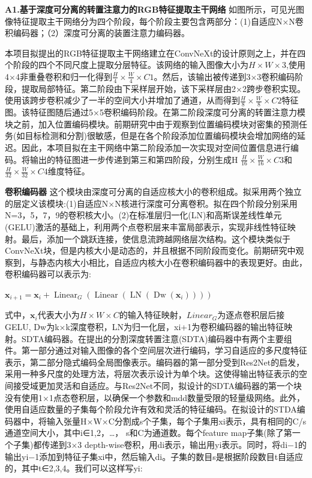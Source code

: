 \documentclass[12pt]{article}
\begin{document}
\textbf{A1.基于深度可分离的转置注意力的RGB特征提取主干网络}
如图所示，可见光图像特征提取主干网络分为四个阶段，每个阶段主要包含两部分：(1)自适应N×N卷积编码器；（2）深度可分离的装置注意力编码器。

本项目拟提出的RGB特征提取主干网络建立在ConvNeXt的设计原则之上，并在四个阶段的四个不同尺度上提取分层特征。该网络的输入图像大小为$H \times W \times 3$,使用4×4非重叠卷积和归一化得到$\frac{H}{4} \times \frac{W}{4} \times C 1$。然后，该输出被传递到3×3卷积编码阶段，提取局部特征。第二阶段由下采样层开始，该下采样层由2×2跨步卷积实现。使用该跨步卷积减少了一半的空间大小并增加了通道，从而得到$\frac{H}{8} \times \frac{W}{8} \times C 2$特征图。该特征图随后通过5×5卷积编码阶段。在第二阶段深度可分离的转置注意力模块之前，加入位置编码模块。前期研究中由于观察到位置编码模块对密集的预测任务(如目标检测和分割)很敏感，但是在各个阶段添加位置编码模块会增加网络的延迟。因此，本项目拟在主干网络中第二阶段添加一次实现对空间位置信息进行编码。将输出的特征图进一步传递到第三和第四阶段，分别生成H $\frac{H}{16} \times \frac{W}{16} \times C 3$和$\frac{H}{32} \times \frac{W}{32} \times C 4$维度特征。

\textbf{卷积编码器} 这个模块由深度可分离的自适应核大小的卷积组成。拟采用两个独立的层定义该模块:(1)自适应N×N核进行深度可分离卷积。拟在四个阶段分别采用N=3，5，7，9的卷积核大小。(2)在标准层归一化(LN)和高斯误差线性单元(GELU)激活的基础上，利用两个点卷积层来丰富局部表示，实现非线性特征映射。最后，添加一个跳跃连接，使信息流跨越网络层次结构。这个模块类似于ConvNeXt块，但是内核大小是动态的，并且根据不同阶段而变化。前期研究中观察到，与静态内核大小相比，自适应内核大小在卷积编码器中的表现更好。由此，卷积编码器可以表示为:

$\boldsymbol{x}_{i+1}=\boldsymbol{x}_{i}+\operatorname{Linear}_{G}\left(\operatorname{Linear}\left(\operatorname{LN}\left(\operatorname{Dw}\left(\boldsymbol{x}_{i}\right)\right)\right)\right)$

式中，$\boldsymbol{x}_{i}$代表大小为$H \times W \times C$的输入特征映射，$Linear_{G}$为逐点卷积层后接GELU, Dw为k×k深度卷积，LN为归一化层，xi+1为卷积编码器的输出特征映射。SDTA编码器。在提出的分割深度转置注意(SDTA)编码器中有两个主要组件。第一部分通过对输入图像的各个空间层次进行编码，学习自适应的多尺度特征表示，第二部分隐式编码全局图像表示。编码器的第一部分受到Res2Net的启发，采用一种多尺度的处理方法，将层次表示设计为单个块。这使得输出特征表示的空间接受域更加灵活和自适应。与Res2Net不同，拟设计的SDTA编码器的第一个块没有使用1×1点态卷积层，以确保一个参数和mdd数量受限的轻量级网络。此外，使用自适应数量的子集每个阶段允许有效和灵活的特征编码。在拟设计的STDA编码器中，将输入张量H×W×C分割成s个子集，每个子集用xi表示，具有相同的C/s通道空间大小，其中i∈{1,2，…， s}和C为通道数。每个feature map子集(除了第一个子集)都传递到3×3 depth-wise卷积，用di表示，输出用yi表示。同时，将di−1的输出yi−1添加到特征子集xi中，然后输入di。子集的数目s是根据阶段数目t自适应的，其中t∈{2,3,4}。我们可以这样写yi:
\end{document}
